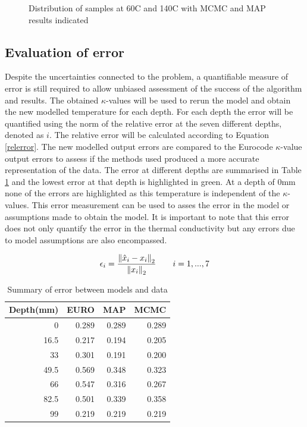 \begin{figure}
\begin{subfigure}[b]{0.2\linewidth}
	\end{subfigure}
	\caption{Distribution of samples at 60\textdegree C and 140\textdegree C with MCMC and MAP results indicated}
	\label{fig:histo}
\end{figure}

%


\subsection{Evaluation of error}
Despite the uncertainties connected to the problem, a quantifiable measure of error is still required to allow unbiased assessment of the success of the algorithm and results.
The obtained $\kappa$-values will be used to rerun the model and obtain the new modelled temperature for each depth. 
For each depth the error will be quantified using the norm of the relative error at the seven different depths, denoted as $i$.
The relative error will be calculated according to  Equation \ref{relerror}. 
The new modelled output errors are compared to the Eurocode $\kappa$-value output errors to assess if the methods used produced a more accurate representation of the data.
The error at different depths are summarised in Table \ref{errortab} and the lowest error at that depth is highlighted in green. 
At a depth of 0mm none of the errors are highlighted as this temperature is independent of the $\kappa$-values.
This error measurement can be used to asses the error in the model or assumptions made to obtain the model.
It is important to note that this error does not only quantify the error in the thermal conductivity but any errors due to model assumptions are also encompassed.

\begin{equation}\label{relerror}
\epsilon _i = \frac{\left\lVert\hat{x}_i-x_i \right\rVert_2}{\left\lVert x_i\right\rVert_2} \quad \quad i= 1, ... ,7
\end{equation}

\begin{table}[H] 
\centering
\caption{Summary of error between models and data}
\label{errortab}
	\begin{tabular}{ r r r r }
	\toprule
	Depth(mm) & EURO & MAP & MCMC\\
	\midrule
	0 & 0.289 & 0.289 & 0.289\\
	16.5 & 0.217 & \cellcolor{green!20}0.194 & 0.205\\
	33 & 0.301   & \cellcolor{green!20} 0.191 & 0.200\\
	49.5 & 0.569 & 0.348 &\cellcolor{green!20} 0.323\\
	66 & 0.547   & 0.316 & \cellcolor{green!20}0.267\\
	82.5 & 0.501 &\cellcolor{green!20} 0.339 & 0.358\\
	99 & 0.219   & 0.219 &\cellcolor{green!20} 0.219\\
	\bottomrule	
	\end{tabular}
	
\end{table}

